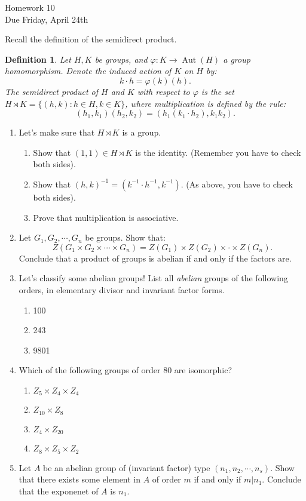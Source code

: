 \documentclass[11pt]{article}
\newtheorem{definition}{Definition}
\newcommand{\Aut}{\operatorname{Aut}}
\begin{document}
\begin{center}
\Large {Homework 10}\\
\small {Due Friday, April 24th}
\end{center}
Recall the definition of the semidirect product.
\begin{definition}
  Let $H,K$ be groups, and $\varphi:K\to\Aut(H)$ a group homomorphism.  Denote the induced action of $K$ on $H$ by:
  \[k\cdot h = \varphi(k)(h).\]
  The \textit{semidirect product} of $H$ and $K$ with respect to $\varphi$ is the set $H\rtimes K = \{(h,k):h\in H,k\in K\}$, where multiplication is defined by the rule:
  \[(h_1,k_1)(h_2,k_2) = (h_1(k_1\cdot h_2),k_1k_2).\]
\end{definition}
\begin{enumerate}
  \item{
  Let's make sure that $H\rtimes K$ is a group.
  \begin{enumerate}
    \item Show that $(1,1)\in H\rtimes K$ is the identity.  (Remember you have to check both sides).
    \item Show that $(h,k)^{-1} = (k^{-1}\cdot h^{-1},k^{-1})$. (As above, you have to check both sides).
    \item Prove that multiplication is associative.
  \end{enumerate}
  }
  \item{
  Let $G_1,G_2,\cdots,G_n$ be groups.  Show that:
  \[Z(G_1\times G_2\times\cdots\times G_n) = Z(G_1)\times Z(G_2)\times\cdot\times Z(G_n).\]
  Conclude that a product of groups is abelian if and only if the factors are.
  }
  \item{
  Let's classify some abelian groups!  List all \textit{abelian} groups of the following orders, in elementary divisor and invariant factor forms.
  \begin{enumerate}
    \item 100
    \item 243
    \item 9801
  \end{enumerate}
  }
  \item{
  Which of the following groups of order 80 are isomorphic?
  \begin{enumerate}
    \item $Z_5\times Z_4\times Z_4$
    \item $Z_{10}\times Z_8$
    \item $Z_4\times Z_{20}$
    \item $Z_8\times Z_5\times Z_2$
  \end{enumerate}
  }
  \item{
  Let $A$ be an abelian group of (invariant factor) type $(n_1,n_2,\cdots,n_s)$.  Show that there exists some element in $A$ of order $m$ if and only if $m|n_1$.  Conclude that the exponenet of $A$ is $n_1$.
  }
\end{enumerate}
\end{document}
